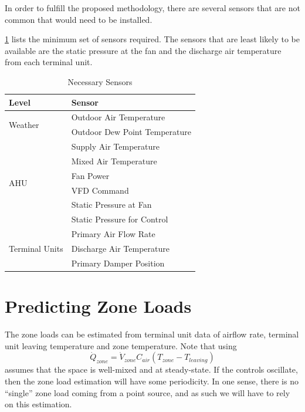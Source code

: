In order to fulfill the proposed methodology, there are several sensors that
are not common that would need to be installed.

\tableref{} \ref{tab:NecessarySensors} lists the minimum set of sensors
required. The sensors that are least likely to be available are the static
pressure at the fan and the discharge air temperature from each terminal
unit.

\begin{table}
\centering
\begin{tabular}{l l}
\toprule

Level & Sensor \\
\midrule\midrule
\multirow{2}{*}{Weather} & Outdoor Air Temperature \\
 & Outdoor Dew Point Temperature \\

 \midrule

\multirow{6}{*}{AHU}              & Supply Air Temperature      \\
                                  & Mixed Air Temperature       \\
                                  & Fan Power                   \\
                                  & VFD Command                 \\
                                  & Static Pressure at Fan      \\
                                  & Static Pressure for Control \\
\midrule
\multirow{4}{*}{Terminal Units}   & Primary Air Flow Rate       \\
                                  & Discharge Air Temperature   \\
                                  & Primary Damper Position     \\

\bottomrule

\end{tabular}
\caption{Necessary Sensors}
\label{tab:NecessarySensors}
\end{table}

\section{Predicting Zone Loads}

The zone loads can be estimated from terminal unit data of airflow rate,
terminal unit leaving temperature and zone temperature. Note that using
%
\begin{equation}
\dot Q_{zone} = \dot V_{zone} C_{air} \left(T_{zone}-T_{leaving} \right)
\end{equation}
%
assumes that the space is well-mixed and at steady-state. If the controls
oscillate, then the zone load estimation will have some periodicity. In one
sense, there is no ``single'' zone load coming from a point source, and as such
we will have to rely on this estimation.


